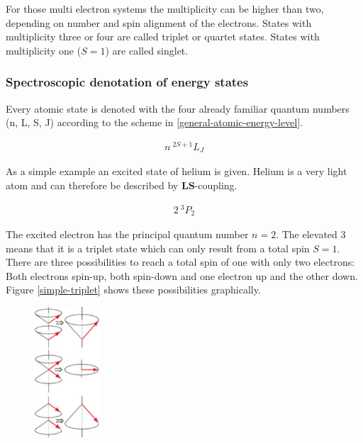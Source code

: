 \documentclass[parskip,12pt,headsepline,a4paper] {scrbook}
\begin{document}
For those multi electron systems the multiplicity can be higher than two, depending on number and spin alignment of the electrons. States with multiplicity three or four are called triplet or quartet states. States with multiplicity one ($S = 1$) are called singlet.


\subsubsection{Spectroscopic denotation of energy states}
\vspace{-1\baselineskip}
Every atomic state is denoted with the four already familiar quantum numbers (n, L, S, J) according to the scheme in \ref{general-atomic-energy-level}.

\begin{align}  \label{general-atomic-energy-level}
n ~ ^{2S+1}L_J
\end{align}

As a simple example an excited state of helium is given. Helium is a very light atom and can therefore be described by $\mathbf{LS}$-coupling.

\begin{align}  \label{atomic-energy-level}
2 ~ ^3P_2
\end{align}

The excited electron has the principal quantum number $n = 2$. The elevated 3 means that it is a triplet state which can only result from a total spin $S = 1$. There are three possibilities to reach a total spin of one with only two electrons: Both electrons spin-up, both spin-down and one electron up and the other down. Figure \ref{simple-triplet} shows these possibilities graphically.

\begin{figure}[ht]
\centerline{
\includegraphics[width=2.5cm]{./spectroscopy/simple-triplet.jpg}}
\end{figure}
\end{document}
